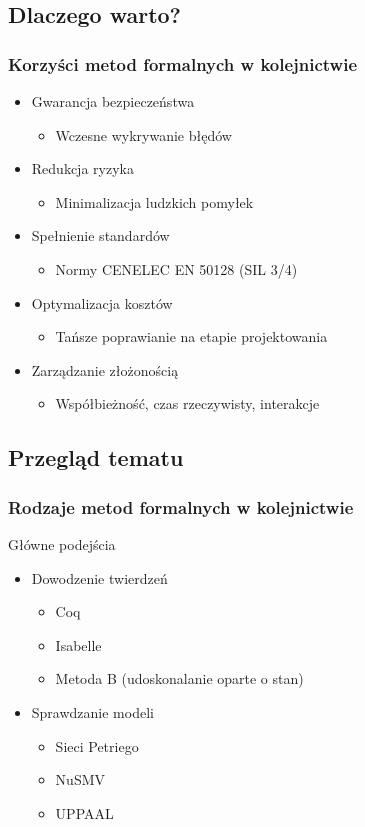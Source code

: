 \documentclass{beamer}
\begin{document}
\subsection{Dlaczego warto?}
\begin{frame}
\frametitle{Korzyści metod formalnych w kolejnictwie}
\begin{itemize}
\item Gwarancja bezpieczeństwa
\begin{itemize}
\item Wczesne wykrywanie błędów
\end{itemize}

\item Redukcja ryzyka
\begin{itemize}
\item Minimalizacja ludzkich pomyłek
\end{itemize}

\item Spełnienie standardów
\begin{itemize}
\item Normy CENELEC EN 50128 (SIL 3/4)
\end{itemize}

\item Optymalizacja kosztów
\begin{itemize}
\item Tańsze poprawianie na etapie projektowania
\end{itemize}

\item Zarządzanie złożonością
\begin{itemize}
\item Współbieżność, czas rzeczywisty, interakcje
\end{itemize}
\end{itemize}
\end{frame}

\subsection{Przegląd tematu}
\begin{frame}
\frametitle{Rodzaje metod formalnych w kolejnictwie}
\begin{block}{Główne podejścia}
\begin{itemize}
\item Dowodzenie twierdzeń
    \begin{itemize}
        \item Coq
        \item Isabelle
        \item Metoda B (udoskonalanie oparte o stan)
    \end{itemize}
\item Sprawdzanie modeli
    \begin{itemize}
        \item Sieci Petriego
        \item NuSMV
        \item UPPAAL
    \end{itemize}
\end{itemize}
\end{block}
\end{frame}
\end{document}
